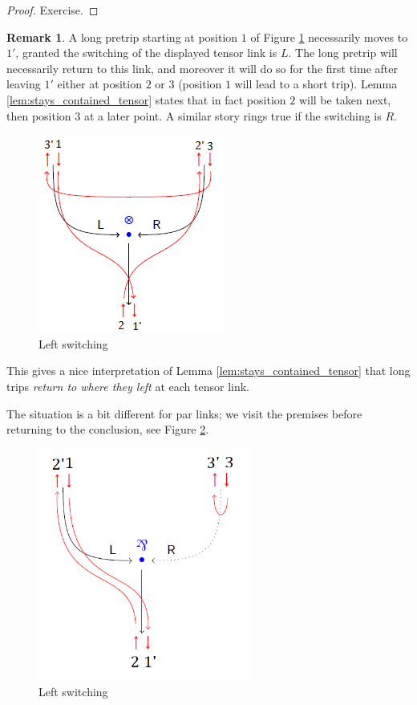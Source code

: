 \documentclass[12pt]{article}
\theoremstyle{plain}
\theoremstyle{definition}
\newtheorem{remark}[thm]{Remark}
\begin{document}
\begin{proof}
Exercise.
\end{proof}
\begin{remark}
A long pretrip starting at position $1$ of Figure \ref{fig:stays_contained_explained_tens} necessarily moves to $1'$, granted the switching of the displayed tensor link is $L$. The long pretrip will necessarily return to this link, and moreover it will do so for the first time after leaving $1'$ either at position $2$ or $3$ (position $1$ will lead to a short trip). Lemma \ref{lem:stays_contained_tensor} states that in fact position $2$ will be taken next, then position $3$ at a later point. A similar story rings true if the switching is $R$.
\begin{figure}[h]
    \centering
    \includegraphics{TensorLeftSwitching.png}
    \caption{Left switching}
    \label{fig:stays_contained_explained_tens}
\end{figure}
This gives a nice interpretation of Lemma \ref{lem:stays_contained_tensor} that long trips \emph{return to where they left} at each tensor link.

The situation is a bit different for par links; we visit the premises before returning to the conclusion, see Figure \ref{fig:stays_contained_explained_par}.
\begin{figure}[h]
    \centering
    \includegraphics[width = 7cm]{ParLeftSwitching.png}
    \caption{Left switching}
    \label{fig:stays_contained_explained_par}
\end{figure}
\end{remark}
\end{document}
